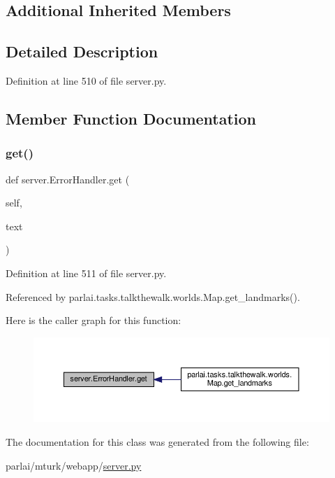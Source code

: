 \subsection*{Additional Inherited Members}


\subsection{Detailed Description}


Definition at line 510 of file server.\+py.



\subsection{Member Function Documentation}
\mbox{\label{classserver_1_1ErrorHandler_a38d1553803482dd9f6be576c66200f43}} 
\subsubsection{\texorpdfstring{get()}{get()}}
{\footnotesize\ttfamily def server.\+Error\+Handler.\+get (\begin{DoxyParamCaption}\item[{}]{self,  }\item[{}]{text }\end{DoxyParamCaption})}



Definition at line 511 of file server.\+py.



Referenced by parlai.\+tasks.\+talkthewalk.\+worlds.\+Map.\+get\+\_\+landmarks().

Here is the caller graph for this function\+:
\nopagebreak
\begin{figure}[H]
\begin{center}
\leavevmode
\includegraphics[width=350pt]{classserver_1_1ErrorHandler_a38d1553803482dd9f6be576c66200f43_icgraph}
\end{center}
\end{figure}


The documentation for this class was generated from the following file\+:\begin{DoxyCompactItemize}
\item 
parlai/mturk/webapp/\hyperlink{server_8py}{server.\+py}\end{DoxyCompactItemize}

